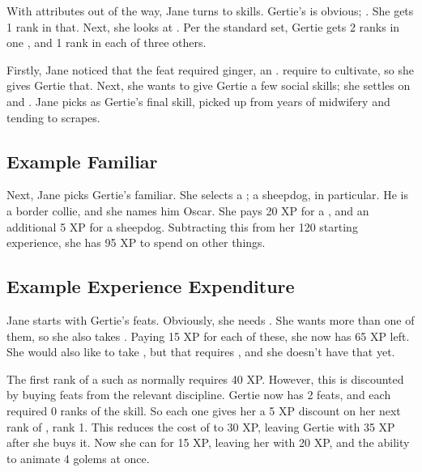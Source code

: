 With attributes out of the way, Jane turns to skills.
Gertie's {\specialityskill} is obvious; .
She gets 1 rank in that.
Next, she looks at {\generalskills}.
Per the standard set, Gertie gets 2 ranks in one {\generalskill}, and 1 rank in each of three others.

Firstly, Jane noticed that the  feat required ginger, an .
 require  to cultivate, so she gives Gertie that.
Next, she wants to give Gertie a few social skills; she settles on  and .
Jane picks  as Gertie's final skill, picked up from years of midwifery and tending to scrapes.

\subsection{Example Familiar}

Next, Jane picks Gertie's familiar.
She selects a ; a sheepdog, in particular.
He is a border collie, and she names him Oscar.
She pays 20 XP for a , and an additional 5 XP for a sheepdog.
Subtracting this from her 120 starting experience, she has 95 XP to spend on other things.

\subsection{Example Experience Expenditure}

Jane starts with Gertie's feats.
Obviously, she needs .
She wants more than one of them, so she also takes .
Paying 15 XP for each of these, she now has 65 XP left.
She would also like to take , but that requires , and she doesn't have that yet.

The first rank of a {\disciplineskill} such as  normally requires 40 XP.
However, this is discounted by buying feats from the relevant discipline.
Gertie now has 2  feats, and each required 0 ranks of the  skill.
So each one gives her a 5 XP discount on her next rank of , rank 1.
This reduces the cost of  to 30 XP, leaving Gertie with 35 XP after she buys it.
Now she can  for 15 XP, leaving her with 20 XP, and the ability to animate 4 golems at once.

